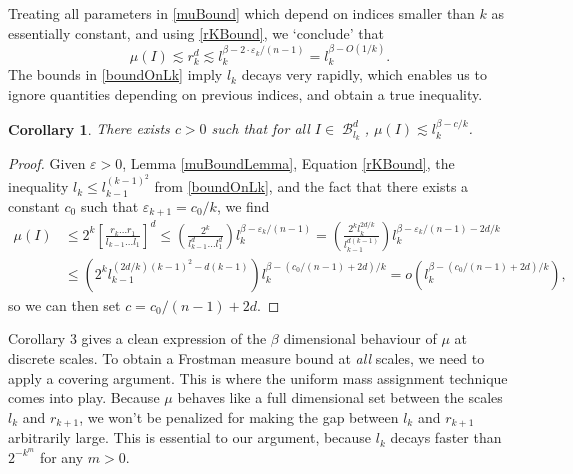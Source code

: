 \documentclass[dvipsnames,letterpaper,12pt]{article}
\numberwithin{equation}{section}
\theoremstyle{plain}
\newtheorem{corollary}{Corollary}
\DeclareMathOperator{\B}{\mathcal{B}}
\begin{document}
Treating all parameters in \eqref{muBound} which depend on indices smaller than $k$ as essentially constant, and using \eqref{rKBound}, we `conclude' that
%
\[ \mu(I) \lesssim r_k^d \lesssim l_k^{\beta - 2 \cdot \varepsilon_k / (n-1)} = l_k^{\beta - O(1/k)}. \]
%
The bounds in \eqref{boundOnLk} imply $l_k$ decays very rapidly, which enables us to ignore quantities depending on previous indices, and obtain a true inequality.

\begin{corollary}
	There exists $c > 0$ such that for all $I \in \B^d_{l_k}$, $\mu(I) \lesssim l_k^{\beta - c/k}$.
\end{corollary}
\begin{proof}
	Given $\varepsilon > 0$, Lemma \ref{muBoundLemma}, Equation \eqref{rKBound}, the inequality $l_k \leq l_{k-1}^{(k-1)^2}$ from \eqref{boundOnLk}, and the fact that there exists a constant $c_0$ such that $\varepsilon_{k+1} = c_0/k$, we find
	\begin{align*}
		\mu(I) &\leq 2^k \left[ \frac{r_k \dots r_1}{l_{k-1} \dots l_1} \right]^d \leq \left( \frac{2^k}{l_{k-1}^d \dots l_1^d} \right) l_k^{\beta - \varepsilon_k / (n-1)} = \left( \frac{2^k l_k^{2d/k}}{l_{k-1}^{d(k-1)}} \right) l_k^{\beta - \varepsilon_k/(n-1) - 2d/k}\\
		&\leq \left( 2^k l_{k-1}^{(2d/k)(k-1)^2 - d(k-1)} \right) l_k^{\beta - (c_0/(n-1) + 2d)/k} = o \left(l_k^{\beta - (c_0/(n-1) + 2d)/k} \right), %
	\end{align*}
	so we can then set $c = c_0/(n-1) + 2d$.
\end{proof}

Corollary 3 gives a clean expression of the $\beta$ dimensional behaviour of $\mu$ at discrete scales. To obtain a Frostman measure bound at {\it all} scales, we need to apply a covering argument. This is where the uniform mass assignment technique comes into play. Because $\mu$ behaves like a full dimensional set between the scales $l_k$ and $r_{k+1}$, we won't be penalized for making the gap between $l_k$ and $r_{k+1}$ arbitrarily large. This is essential to our argument, because $l_k$ decays faster than $2^{-k^m}$ for any $m > 0$.
\end{document}
